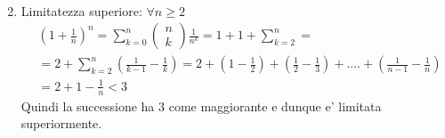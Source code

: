 \documentclass{article}
\begin{document}
\begin{flushleft}
\begin{enumerate}
\begin{equation}
\begin{aligned}
                        \end{aligned}
                    \end{equation}
                \item Limitatezza superiore: $\forall n \geq 2$
                    \begin{equation}
                        \begin{aligned}
                            & (1+\frac{1}{n})^n = \sum_{k=0}^{n}
                            \begin{pmatrix}
                                n \\
                                k
                            \end{pmatrix}\frac{1}{n^k}=1+1+\sum_{k=2}^{n}=\\
                            & =2+\sum_{k=2}^{n}(\frac{1}{k-1}-\frac{1}{k})=2+(1-\frac{1}{2})+(\frac{1}{2}-\frac{1}{3})+....+(\frac{1}{n-1}-\frac{1}{n})\\
                            & = 2+1-\frac{1}{n} < 3
                       \end{aligned}
                    \end{equation}
                    Quindi la successione ha 3 come maggiorante e dunque e' limitata superiormente.
            \end{enumerate}
        \end{flushleft}
\end{document}
